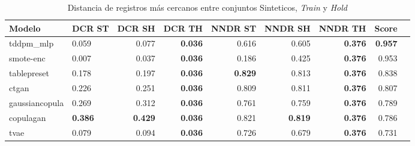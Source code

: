 \begin{table}[H]
\centering
\caption{Distancia de registros más cercanos entre conjuntos Sinteticos, \emph{Train} y \emph{Hold}}
\label{table-dcr-king county-a-2}
\begin{tabular}{|l|l|r|r|r|r|r|r|r|}
\hline
\rowcolor[gray]{0.8}
Modelo & DCR ST & DCR SH & DCR TH & NNDR ST & NNDR SH & NNDR TH & \textbf{Score} \\
\hline tddpm\_mlp & 0.059 & 0.077 & \bfseries 0.036 & 0.616 & 0.605 & \bfseries 0.376 & \bfseries 0.957 \\
\hline smote-enc & \cellcolor[rgb]{0.9, 0.54, 0.52} 0.007 & \cellcolor[rgb]{0.9, 0.54, 0.52} 0.037 & \bfseries 0.036 & 0.186 & 0.425 & \bfseries 0.376 & 0.953 \\
\hline tablepreset & 0.178 & 0.197 & \bfseries 0.036 & \bfseries 0.829 & 0.813 & \bfseries 0.376 & 0.838 \\
\hline ctgan & 0.226 & 0.251 & \bfseries 0.036 & 0.809 & 0.811 & \bfseries 0.376 & 0.807 \\
\hline gaussiancopula & 0.269 & 0.312 & \bfseries 0.036 & 0.761 & 0.759 & \bfseries 0.376 & 0.789 \\
\hline copulagan & \bfseries 0.386 & \bfseries 0.429 & \bfseries 0.036 & 0.821 & \bfseries 0.819 & \bfseries 0.376 & 0.786 \\
\hline tvae & 0.079 & 0.094 & \bfseries 0.036 & 0.726 & 0.679 & \bfseries 0.376 & 0.731 \\
\hline
\end{tabular}
\end{table}

